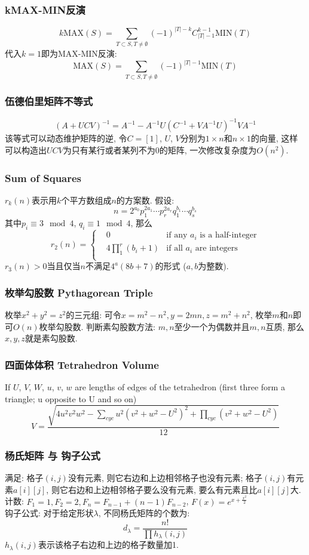 \begin{footnotesize}
\subsubsection{kMAX-MIN反演}
\[k \mathrm{MAX}(S)=\sum_{T\subset S, T\neq \emptyset}(-1)^{|T|-k}C_{|T|-1}^{k-1}\mathrm{MIN}(T)\]
代入$k=1$即为MAX-MIN反演:
\[\mathrm{MAX}(S)=\sum_{T\subset S, T\neq \emptyset}(-1)^{|T|-1}\mathrm{MIN}(T)\]
\subsubsection{伍德伯里矩阵不等式}
$$(A+UCV)^{-1}=A^{-1}-A^{-1}U(C^{-1}+VA^{-1}U)^{-1}VA^{-1}$$
该等式可以动态维护矩阵的逆, 令$C=[1]$, $U$, $V$分别为$1\times n$和$n\times 1$的向量, 这样可以构造出$UCV$为只有某行或者某列不为0的矩阵, 一次修改复杂度为$O(n^2)$.
\subsubsection{Sum of Squares}
$r_k(n)$表示用$k$个平方数组成$n$的方案数. 假设: 
\[n=2^{a_0}p_1^{2a_1}\cdots p_r^{2a_r}q_1^{b_1}\cdots q_s^{b_s}\]
其中$p_i\equiv 3 \mod 4$, $q_i\equiv 1 \mod 4$, 那么
\[r_2(n)=\left\{\begin{aligned}
& 0 & \text{if any }a_i\text{ is a half-integer}\\
& 4\prod_1^r(b_i+1) & \text{if all }a_i\text{ are integers}\\
\end{aligned}\right.\]
$r_3(n)>0$当且仅当$n$不满足$4^a(8b+7)$的形式 ($a,b$为整数).
\subsubsection{枚举勾股数 Pythagorean Triple}
枚举$x^2+y^2=z^2$的三元组: 可令$x=m^2-n^2,y=2mn,z=m^2+n^2$, 枚举$m$和$n$即可$O(n)$枚举勾股数. 判断素勾股数方法: $m,n$至少一个为偶数并且$m,n$互质, 那么$x,y,z$就是素勾股数.
\subsubsection{四面体体积 Tetrahedron Volume}
If $U$, $V$, $W$, $u$, $v$, $w$ are lengths of edges of the tetrahedron (first three form a triangle; u opposite to U and so on)
\[ V = \frac{\sqrt{ 4u^2v^2w^2 - \sum_{cyc}{u^2(v^2+w^2-U^2)^2} + \prod_{cyc}{(v^2+w^2-U^2)} }}{12} \]
\subsubsection{杨氏矩阵 与 钩子公式}
满足: 格子$(i,j)$没有元素, 则它右边和上边相邻格子也没有元素; 格子$(i,j)$有元素$a[i][j]$, 则它右边和上边相邻格子要么没有元素, 要么有元素且比$a[i][j]$大.\\
计数: $F_1=1,F_2=2,F_n=F_{n-1}+(n-1)F_{n-2}$, $F(x)=e^{x+\frac{x^2}{2}}$\\
钩子公式: 对于给定形状$\lambda$, 不同杨氏矩阵的个数为:
\[d_\lambda=\frac{n!}{\prod h_\lambda(i,j)}\]
$h_\lambda(i,j)$表示该格子右边和上边的格子数量加1. 


\end{footnotesize}
